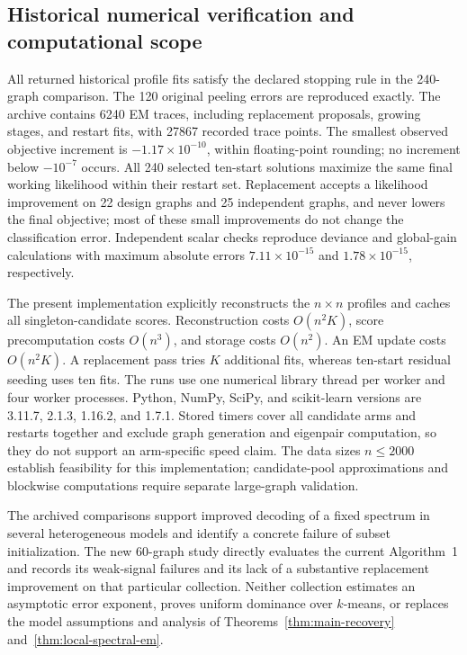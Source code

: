 \subsection{Historical numerical verification and computational scope}

All returned historical profile fits satisfy the declared stopping rule in the 240-graph
comparison. The 120 original peeling errors are reproduced exactly. The
archive contains 6240 EM traces, including replacement proposals, growing
stages, and restart fits, with 27867 recorded trace points. The smallest
observed objective increment is $-1.17\times10^{-10}$, within floating-point
rounding; no increment below $-10^{-7}$ occurs. All 240 selected ten-start
solutions maximize the same final working likelihood within their restart
set. Replacement accepts a likelihood improvement on 22 design graphs and
25 independent graphs, and never lowers the final objective; most of these
small improvements do not change the classification error. Independent
scalar checks reproduce deviance and global-gain calculations with maximum
absolute errors $7.11\times10^{-15}$ and $1.78\times10^{-15}$, respectively.

The present implementation explicitly reconstructs the $n\times n$ profiles
and caches all singleton-candidate scores. Reconstruction costs
$O(n^2K)$, score precomputation costs $O(n^3)$, and storage costs $O(n^2)$.
An EM update costs $O(n^2K)$. A replacement pass tries $K$ additional fits,
whereas ten-start residual seeding uses ten fits. The runs use one numerical
library thread per worker and four worker processes. Python, NumPy, SciPy,
and scikit-learn versions are 3.11.7, 2.1.3, 1.16.2, and 1.7.1. Stored timers
cover all candidate arms and restarts together and exclude graph generation
and eigenpair computation, so they do not support an arm-specific speed
claim. The data sizes $n\le2000$ establish feasibility for this implementation;
candidate-pool approximations and blockwise computations require separate
large-graph validation.

The archived comparisons support improved decoding of a fixed spectrum in
several heterogeneous models and identify a concrete failure of subset
initialization. The new 60-graph study directly evaluates the current
Algorithm~1 and records its weak-signal failures and its lack of a substantive
replacement improvement on that particular collection. Neither collection
estimates an asymptotic error exponent, proves uniform dominance over
$k$-means, or replaces the model assumptions and analysis of
Theorems~\ref{thm:main-recovery} and~\ref{thm:local-spectral-em}.

